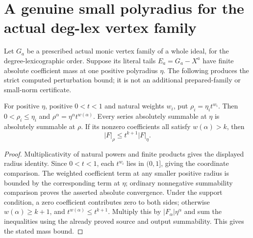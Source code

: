 \section{A genuine small polyradius for the actual deg-lex vertex family}
\label{sec:hironaka-actual-vertex-small-radius}
Let $G_a$ be a prescribed actual monic vertex family of a whole ideal, for the degree-lexicographic order. Suppose its literal tails $E_a=G_a-X^a$ have finite absolute coefficient mass at one positive polyradius $\eta$. The following produces the strict computed perturbation bound; it is not an additional prepared-family or small-norm certificate.

\begin{theorem}
\label{hir:actual-anisotropic-coefficient-mass}
\leanok
For positive $\eta$, positive $0<t<1$ and natural weights $w_i$, put $\rho_i=\eta_i t^{w_i}$. Then $0<\rho_i\le\eta_i$ and $\rho^\alpha=\eta^\alpha t^{w(\alpha)}$. Every series absolutely summable at $\eta$ is absolutely summable at $\rho$. If its nonzero coefficients all satisfy $w(\alpha)>k$, then
\[
 |F|_\rho\le t^{k+1}|F|_\eta.
\]
\end{theorem}
\begin{proof}
Multiplicativity of natural powers and finite products gives the displayed radius identity. Since $0<t<1$, each $t^{w_i}$ lies in $(0,1]$, giving the coordinate comparison. The weighted coefficient term at any smaller positive radius is bounded by the corresponding term at $\eta$; ordinary nonnegative summability comparison proves the asserted absolute convergence. Under the support condition, a zero coefficient contributes zero to both sides; otherwise $w(\alpha)\ge k+1$, and $t^{w(\alpha)}\le t^{k+1}$. Multiply this by $|F_\alpha|\eta^\alpha$ and sum the inequalities using the already proved source and output summability. This gives the stated mass bound.
\end{proof}

